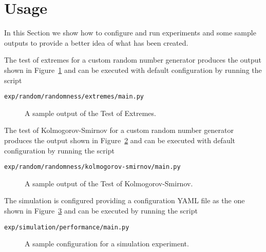\section{Usage}
\label{sec:usage}


In this Section we show how to configure and run experiments and some sample outputs to provide a better idea of what has been created.

The test of extremes for a custom random number generator produces the output shown in Figure~\ref{fig:usage-randomness-extremes} and can be executed with default configuration by running the script

\begin{lstlisting}
exp/random/randomness/extremes/main.py
\end{lstlisting}

\begin{figure}
	\centering
	
	\caption{A sample output of the Test of Extremes.}
	\label{fig:usage-randomness-extremes}
\end{figure}

The test of Kolmogorov-Smirnov for a custom random number generator produces the output shown in Figure~\ref{fig:usage-randomness-kolmogorov-smirnov} and can be executed with default configuration by running the script

\begin{lstlisting}
exp/random/randomness/kolmogorov-smirnov/main.py
\end{lstlisting}

\begin{figure}
	\centering
	
	\caption{A sample output of the Test of Kolmogorov-Smirnov.}
	\label{fig:usage-randomness-kolmogorov-smirnov}
\end{figure}

The simulation is configured providing a configuration YAML file as the one shown in Figure~\ref{fig:usage-simulation-configuration} and can be executed by running the script

\begin{lstlisting}
exp/simulation/performance/main.py
\end{lstlisting}

\begin{figure}
	\centering
	
	\caption{A sample configuration for a simulation experiment.}
	\label{fig:usage-simulation-configuration}
\end{figure}


